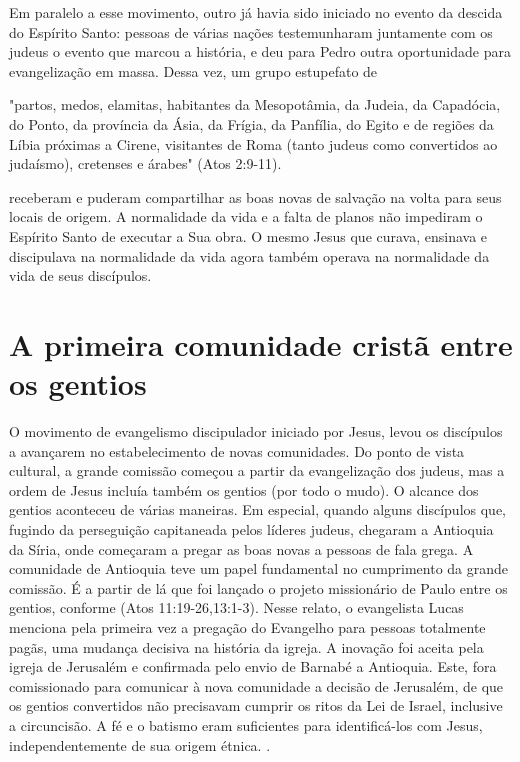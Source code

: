 \documentclass[12pt,openright,oneside,a4paper,
english,french,spanish,brazil]{abntex2}
\begin{document}
Em paralelo a esse movimento, outro já havia sido iniciado no evento da descida do Espírito Santo: pessoas de várias nações testemunharam juntamente com os judeus o evento que marcou a história, e deu para Pedro outra oportunidade para evangelização em massa. Dessa vez, um grupo estupefato de 
\begin{citacao}"partos, medos, elamitas, habitantes da Mesopotâmia, da Judeia, da Capadócia, do Ponto, da província da Ásia, da Frígia, da Panfília, do Egito e de regiões da Líbia próximas a Cirene, visitantes de Roma (tanto judeus como convertidos ao judaísmo), cretenses e árabes" (Atos 2:9-11).\end{citacao} receberam e puderam compartilhar as boas novas de salvação na volta para seus locais de origem. A normalidade da vida e a falta de planos não impediram o Espírito Santo de executar a Sua obra. O mesmo Jesus que curava, ensinava e discipulava na normalidade da vida agora também operava na normalidade da vida de seus discípulos.

\section{A primeira comunidade cristã entre os gentios}

O movimento de evangelismo discipulador iniciado por Jesus, levou os discípulos a avançarem no estabelecimento de novas comunidades. Do ponto de vista cultural, a grande comissão começou a partir da evangelização dos judeus, mas a ordem de Jesus incluía também os gentios (por todo o mudo). O alcance dos gentios aconteceu de várias maneiras. Em especial, quando alguns discípulos que, fugindo da perseguição capitaneada pelos líderes judeus, chegaram a Antioquia da Síria, onde começaram a pregar as boas novas a pessoas de fala grega. A comunidade de Antioquia teve um papel fundamental no cumprimento da grande comissão. É a partir de lá que foi lançado o projeto missionário de Paulo entre os gentios, conforme (Atos 11:19-26,13:1-3). Nesse relato, o evangelista Lucas menciona pela primeira vez a pregação do Evangelho para pessoas totalmente pagãs, uma mudança decisiva na história da igreja. A inovação foi aceita pela igreja de Jerusalém e confirmada pelo envio de Barnabé a Antioquia. Este, fora comissionado para comunicar à nova comunidade a decisão de Jerusalém, de que os gentios convertidos não precisavam cumprir os ritos da Lei de Israel, inclusive a circuncisão. A fé e o batismo eram suficientes para identificá-los com Jesus, independentemente de sua origem étnica. \cite[p. 198]{green}.
\end{document}
